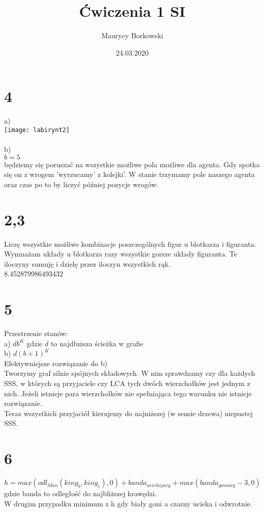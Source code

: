 \documentclass{article}
\title{Ćwiczenia 1 SI}
\date{24.03.2020}
\author{Maurycy Borkowski}
\begin{document}
\maketitle

\section{4}
a)\\
\texttt{[image: labirynt2]}
\\\\
b)
\\
$b = 5$ \\ będziemy się poruszać na wszystkie możliwe pola możliwe dla agenta. Gdy spotka się on z wrogem 'wyrzucamy' z kolejki'. W stanie trzymamy pole naszego agenta oraz czas po to by liczyć później pozycje wrogów.

\section{2,3}
Liczę wszystkie możliwe kombinacje poszczególnych figur u blotkarza i figuranta.\\
Wymnażam układy u blotkarza razy wszystkie gorsze układy figuranta. Te iloczyny sumuję i dzielę przez iloczyn wszystkich rąk.\\
8.452879986493432
\section{5}
Przestrzenie stanów:
\\a)  $db^K$ gdzie $d$ to najdłuższa ścieżka w grafie
\\b)  $d{(b+1)}^K$
\\Efektywniejsze rozwiązanie do b)\\
Tworzymy graf silnie spójnych składowych. W nim sprawdzamy czy dla każdych SSS, w których są przyjaciele czy LCA tych dwóch wierzchołków jest jednym z nich. Jeżeli istnieje para wierzchołków nie spełniająca tego warunku nie istnieje rozwiązanie.
\\
Teraz wszystkich przyjaciół kierujemy do najniższej (w sensie drzewa) niepustej SSS.
\section{6}
$$
h = max(odl_{Man}(king_b, king_c),0) + banda_{uciekajacy} + max(banda_{goniacy}-3,0)
$$
gdzie banda to odległość do najbliższej krawędzi.
\\
W drugim przypadku minimum z h gdy biały goni a czarny ucieka i odwrotnie.
\end{document}

